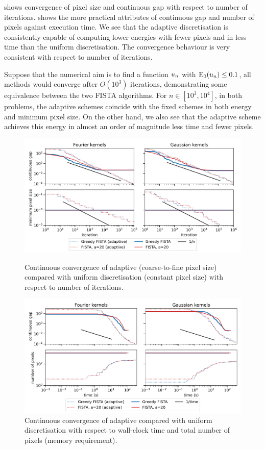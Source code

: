 \documentclass[10pt,a4paper,onecolumn]{article}
\numberwithin{equation}{section}
\newcommand{\op}[1]{\operatorname{#1}}\newcommand{\overtext}[2]{\stackrel{\text{#1}}{#2}}
\newcommand*{\Func}[1]{%
	\IfEqCase{#1}{%
		{0}{\op{E}}%
		{1}{\op{F}}%
		{2}{\op{G}}%
		{3}{\op{H}}%
	}[\op{F}#1]%
}
\newcommand*{\varf}[1]{%
	\IfEqCase{#1}{%
		{0}{u}%
		{1}{v}%
		{2}{w}%
	}[u#1]%
}
\begin{document}
 shows convergence of pixel size and continuous gap with respect to number of iterations.  shows the more practical attributes of continuous gap and number of pixels against execution time. We see that the adaptive discretisation is consistently capable of computing lower energies with fewer pixels and in less time than the uniform discretisation. The convergence behaviour is very consistent with respect to number of iterations.

Suppose that the numerical aim is to find a function $\varf0_n$ with $\Func0_0(\varf0_n)\leq 0.1$, all methods would converge after $O(10^3)$ iterations, demonstrating some equivalence between the two FISTA algorithms. For $n\in[10^3,10^4]$, in both problems, the adaptive schemes coincide with the fixed schemes in both energy and minimum pixel size. On the other hand, we also see that the adaptive scheme achieves this energy in almost an order of magnitude less time and fewer pixels.

\begin{figure}[H]\centering
	\includegraphics[width=.84\textwidth]{lasso_reduced_convergence}
	\caption{Continuous convergence of adaptive (coarse-to-fine pixel size) compared with uniform discretisation (constant pixel size) with respect to number of iterations. }\label{fig: comparison with iteration}

	\vspace*{\floatsep}

	\includegraphics[width=.84\textwidth]{lasso_convergence_time}
	\caption{Continuous convergence of adaptive compared with uniform discretisation with respect to wall-clock time and total number of pixels (memory requirement).}\label{fig: comparison with time}
\end{figure}
\end{document}
